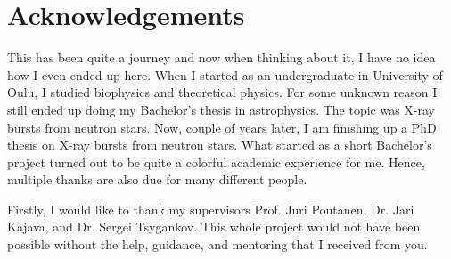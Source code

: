 \chapter*{Acknowledgements}

\vspace{-0.9cm}
This has been quite a journey and now when thinking about it, I have no idea how I even ended up here.
When I started as an undergraduate in University of Oulu, I studied biophysics and theoretical physics.
For some unknown reason I still ended up doing my Bachelor's thesis in astrophysics.
The topic was X-ray bursts from neutron stars.
Now, couple of years later, I am finishing up a PhD thesis on X-ray bursts from neutron stars.
What started as a short Bachelor's project turned out to be quite a colorful academic experience for me.
Hence, multiple thanks are also due for many different people.



Firstly, I would like to thank my supervisors Prof. Juri Poutanen, Dr. Jari Kajava, and Dr. Sergei Tsygankov.
This whole project would not have been possible without the help, guidance, and mentoring that I received from you.


 
